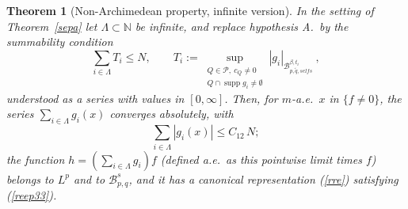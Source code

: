 \documentclass[11pt]{amsart}
\newtheorem{theorem}{Theorem}[section]
\theoremstyle{definition}
\begin{document}
\begin{theorem}[Non-Archimedean property, infinite version]\label{sepainf}
In the setting of Theorem~\ref{sepa} let $\Lambda \subset \mathbb{N}$ be
infinite, and replace hypothesis A.\ by the summability condition
$$\sum_{i \in \Lambda} T_i \leq N, \qquad
T_i := \sup_{\substack{ Q\in \mathcal{P},\ c_Q\neq 0 \\ Q\cap \operatorname{supp} g_i \neq \emptyset}}
|g_i|_{ \mathcal{B}^{\beta,t_i}_{p,\tilde{q},selfs}}\ ,$$
understood as a series with values in $[0,\infty]$. Then, for $m$-a.e.\ $x$
in $\{f \neq 0\}$, the series $\sum_{i\in\Lambda} g_i(x)$ converges
absolutely, with
$$\sum_{i\in\Lambda} |g_i(x)| \leq C_{12}\, N;$$
the function
$h = (\sum_{i\in\Lambda} g_i) f$ (defined a.e.\ as this pointwise limit
times $f$) belongs to $L^p$ and to $\mathcal{B}^s_{p,q}$, and it has a
canonical representation (\ref{rre}) satisfying
(\ref{reep33}).
\end{theorem}
\end{document}
